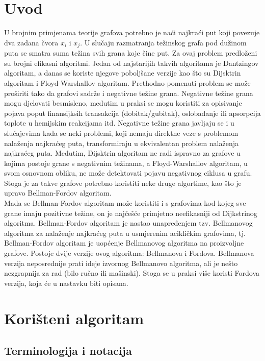 \documentclass[conference]{IEEEtran}
\begin{document}
\section{Uvod}
U brojnim primjenama teorije grafova potrebno je naći najkraći put koji povezuje dva zadana čvora $x_i$ i $x_j$. U slučaju razmatranja težinskog grafa pod dužinom puta se smatra suma težina svih grana koje čine put. Za ovaj problem predloženi su brojni efikasni algoritmi. Jedan od najstarijih takvih algoritama je Dantzingov algoritam, a danas se koriste njegove poboljšane verzije kao što su Dijsktrin algoritam i Floyd-Warshallov algoritam. Prethodno pomenuti problem se može proširiti tako da grafovi sadrže i negativne težine grana. Negativne težine grana mogu djelovati besmisleno, međutim u praksi se mogu koristiti za opisivanje pojava poput finansijksih transakcija (dobitak/gubitak), oslobađanje ili  apsorpcija toplote u hemijskim reakcijama itd. Negativne težine grana javljaju se i u slučajevima kada se neki problemi, koji nemaju direktne veze s problemom nalaženja najkraćeg puta, transformiraju u ekvivalentan problem nalaženja najkraćeg puta\cite{dm}. Međutim, Dijsktrin algoritam ne radi ispravno za grafove u kojima postoje grane s negativnim težinama, a Floyd-Warshallov algoritam, u svom osnovnom obliku, ne može detektovati pojavu negativnog ciklusa u grafu. Stoga je za takve grafove potrebno koristiti neke druge algortime, kao što je upravo Bellman-Fordov algoritam.
\\ \indent Mada se Bellman-Fordov algoritam može koristiti i s grafovima kod kojeg sve grane imaju pozitivne težine, on je najčešće primjetno neefikasniji od Dijkstrinog algoritma. Bellman-Fordov algoritam je nastao unapređenjem tzv.
Bellmanovog algoritma za nalaženje najkraćeg puta u usmjerenim acikličkim grafovima, tj. Bellman-Fordov algoritam je uopćenje Bellmanovog algoritma na proizvoljne grafove. Postoje dvije verzije ovog algoritma:
Bellmanova i Fordova. Bellmanova verzija neposrednije prati ideje izvornog Bellmanovo algoritma, ali je nešto nezgrapnija za rad (bilo ručno ili mašinski)\cite{dm}. Stoga se u praksi više koristi Fordova verzija, koja će u nastavku biti opisana.  

 




\section{Korišteni algoritam}

\subsection{Terminologija i notacija}
\end{document}
